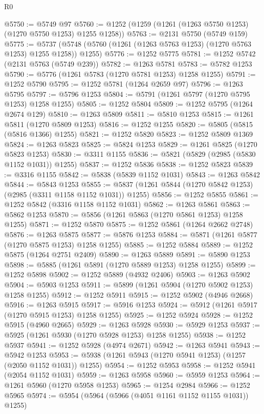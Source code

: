 \begin{lexlean}{R0}
\begin{coremodule}
@5750 := @5749 @97
@5760 := @1252 (@1259 (@1261 (@1263 @5750 @1253) (@1270 @5750 @1253) @1255 @1258))
@5763 := @2131 @5750 (@5749 @159)
@5775 := @5737 (@5748 (@5760 (@1261 (@1263 @5763 @1253) (@1270 @5763 @1253) @1255 @1258)) @1255)
@5776 := @1252 @5775
@5781 := @1252 @5742 (@2131 @5763 (@5749 @239))
@5782 := @1263 @5781
@5783 := @5782 @1253
@5790 := @5776 (@1261 @5783 (@1270 @5781 @1253) @1258 @1255)
@5791 := @1252 @5790
@5795 := @1252 @5781 (@1264 @2659 @97)
@5796 := @1263 @5795
@5797 := @5796 @1253
@5804 := @5791 (@1261 @5797 (@1270 @5795 @1253) @1258 @1255)
@5805 := @1252 @5804
@5809 := @1252 @5795 (@1264 @2674 @129)
@5810 := @1263 @5809
@5811 := @5810 @1253
@5815 := @1261 @5811 (@1270 @5809 @1253)
@5816 := @1252 @1255
@5820 := @5805 (@5815 (@5816 @1366) @1255)
@5821 := @1252 @5820
@5823 := @1252 @5809 @1369
@5824 := @1263 @5823
@5825 := @5824 @1253
@5829 := @1261 @5825 (@1270 @5823 @1253)
@5830 := @3311 @1155
@5836 := @5821 (@5829 (@2985 (@5830 @1152 @1031)) @1255)
@5837 := @1252 @5836
@5838 := @1252 @5823
@5839 := @3316 @1155
@5842 := @5838 (@5839 @1152 @1031)
@5843 := @1263 @5842
@5844 := @5843 @1253
@5855 := @5837 (@1261 @5844 (@1270 @5842 @1253) (@2985 (@3311 @1158 @1152 @1031)) @1255)
@5856 := @1252 @5855
@5861 := @1252 @5842 (@3316 @1158 @1152 @1031)
@5862 := @1263 @5861
@5863 := @5862 @1253
@5870 := @5856 (@1261 @5863 (@1270 @5861 @1253) @1258 @1255)
@5871 := @1252 @5870
@5875 := @1252 @5861 (@1264 @2662 @2748)
@5876 := @1263 @5875
@5877 := @5876 @1253
@5884 := @5871 (@1261 @5877 (@1270 @5875 @1253) @1258 @1255)
@5885 := @1252 @5884
@5889 := @1252 @5875 (@1264 @2751 @2409)
@5890 := @1263 @5889
@5891 := @5890 @1253
@5898 := @5885 (@1261 @5891 (@1270 @5889 @1253) @1258 @1255)
@5899 := @1252 @5898
@5902 := @1252 @5889 (@4932 @2406)
@5903 := @1263 @5902
@5904 := @5903 @1253
@5911 := @5899 (@1261 @5904 (@1270 @5902 @1253) @1258 @1255)
@5912 := @1252 @5911
@5915 := @1252 @5902 (@4946 @2668)
@5916 := @1263 @5915
@5917 := @5916 @1253
@5924 := @5912 (@1261 @5917 (@1270 @5915 @1253) @1258 @1255)
@5925 := @1252 @5924
@5928 := @1252 @5915 (@4960 @2665)
@5929 := @1263 @5928
@5930 := @5929 @1253
@5937 := @5925 (@1261 @5930 (@1270 @5928 @1253) @1258 @1255)
@5938 := @1252 @5937
@5941 := @1252 @5928 (@4974 @2671)
@5942 := @1263 @5941
@5943 := @5942 @1253
@5953 := @5938 (@1261 @5943 (@1270 @5941 @1253) (@1257 (@2050 @1152 @1031)) @1255)
@5954 := @1252 @5953
@5958 := @1252 @5941 (@2054 @1152 @1031)
@5959 := @1263 @5958
@5960 := @5959 @1253
@5964 := @1261 @5960 (@1270 @5958 @1253)
@5965 := @1254 @2984
@5966 := @1252 @5965
@5974 := @5954 (@5964 (@5966 (@4051 @1161 @1152 @1155 @1031)) @1255)

\end{coremodule}
\end{lexlean}
